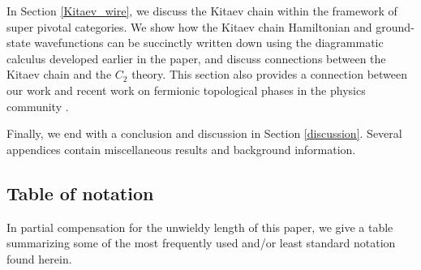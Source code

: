 In Section \ref{Kitaev_wire}, we discuss the Kitaev chain within the framework of super pivotal 
categories. 
We show how the Kitaev chain Hamiltonian and ground-state wavefunctions can be 
succinctly written down using the diagrammatic calculus developed earlier in the paper, and 
discuss connections between the Kitaev chain and the $C_2$ theory. 
This section also provides a connection between our work 
and recent work on fermionic topological phases in the physics community \cite{ware2016,tarantino2016,turzillo2016}. 

Finally, we end with a conclusion and discussion in Section \ref{discussion}. 
Several appendices contain miscellaneous results and background information. 


\bigskip










\subsection{Table of notation}

In partial compensation for the unwieldy length of this paper, we give a table summarizing some of the 
most frequently used and/or least standard notation found herein.


\medskip


